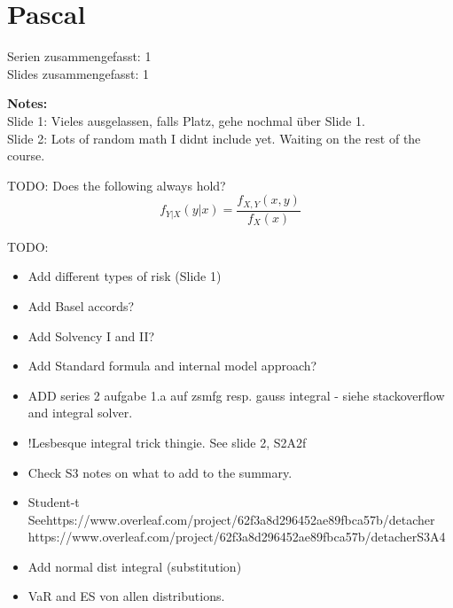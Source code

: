 \section*{Pascal}
Serien zusammengefasst: 1 \\
Slides zusammengefasst: 1 

\textbf{Notes:} \\
Slide 1: Vieles ausgelassen, falls Platz, gehe nochmal über
Slide 1. \\
Slide 2: Lots of random math I didnt include yet. Waiting on the rest of the
course.

TODO: Does the following always hold?
\[
    f_{Y|X}(y|x) = \frac{f_{X,Y}(x,y)}{f_X(x)}
\]

TODO:
\begin{itemize}
  \item Add different types of risk (Slide 1)
  \item Add Basel accords?
  \item Add Solvency I and II?
  \item Add Standard formula and internal model approach?
  \item ADD series 2 aufgabe 1.a auf zsmfg resp. gauss integral - siehe
        stackoverflow and integral solver.
  \item !Lesbesque integral trick thingie. See slide 2, S2A2f
  \item Check S3 notes on what to add to the summary.
  \item Student-t Seehttps://www.overleaf.com/project/62f3a8d296452ae89fbca57b/detacher https://www.overleaf.com/project/62f3a8d296452ae89fbca57b/detacherS3A4
  \item Add normal dist integral (substitution)
  \item VaR and ES von allen distributions.
\end{itemize}